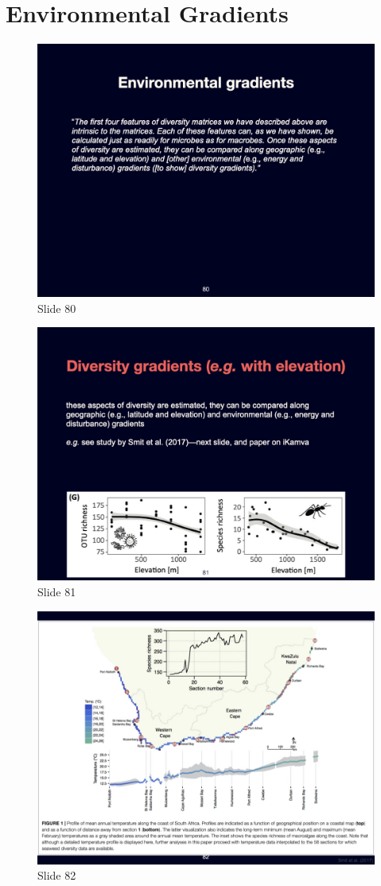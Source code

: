 \documentclass[
  10pt,
]{book}
\begin{document}
\section{Environmental Gradients}\label{environmental-gradients-2}

\begin{figure}[ht]
\centering
\includegraphics[width=0.8\linewidth]{../images/BDC334/BDC334-080.jpeg}
\caption*{Slide 80}
\end{figure}

\begin{figure}[ht]
\centering
\includegraphics[width=0.8\linewidth]{../images/BDC334/BDC334-081.jpeg}
\caption*{Slide 81}
\end{figure}

\begin{figure}[ht]
\centering
\includegraphics[width=0.8\linewidth]{../images/BDC334/BDC334-082.jpeg}
\caption*{Slide 82}
\end{figure}
\end{document}
